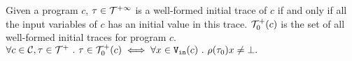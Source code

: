 %
%
%
\begin{defn}
  \label{def:initial_trace}
  Given a program $c$, $\mathtt{\tau} \in \mathcal{T}^{+\infty}$ is a well-formed initial trace of $c$ if and only if all the input variables of $c$ has an initial value in this trace. $\mathcal{T}^{+}_0(c)$ is the set of all well-formed initial traces for program $c$.
 $
    \forall c \in \mathcal{C}, \mathtt{\tau} \in \mathcal{T}^{+} ~.~ \mathtt{\tau} \in \mathcal{T}^{+}_0(c) \iff 
    \forall x \in {\ensuremath{\mathtt{V_{\mathtt{in}}}}}(c) ~.~ \rho(\mathtt{\tau}_0) x \neq \bot.
$
\end{defn}
%
%
